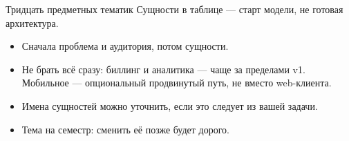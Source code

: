 \begin{frame}{Тридцать предметных тематик}
  Сущности в таблице --- старт модели, не готовая архитектура.

  \medskip
  \begin{itemize}\setlength\itemsep{0.4em}
    \item Сначала проблема и аудитория, потом сущности.
    \item Не брать \flqq всё сразу\frqq: биллинг и аналитика --- чаще за пределами v1.
          Мобильное --- опциональный продвинутый путь, не вместо web-клиента.
    \item Имена сущностей можно уточнить, если это следует из вашей задачи.
    \item Тема на семестр: сменить её позже будет дорого.
  \end{itemize}
\end{frame}
